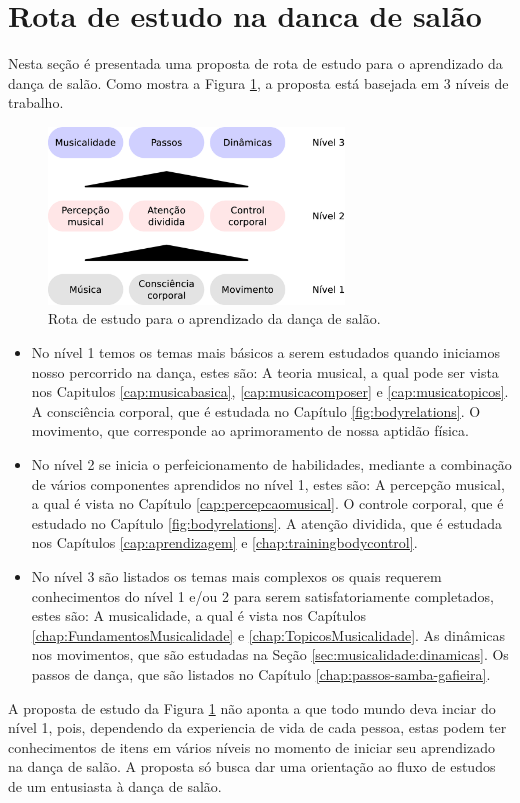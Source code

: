 \section{Rota de estudo na danca de salão}
\label{sec:dance-elements-processo}
Nesta seção é presentada uma proposta de rota de estudo para o aprendizado da
dança de salão. 
Como mostra a Figura \ref{fig:dance-elements-processo},
a proposta está basejada em 3 níveis de trabalho.
\begin{figure}[!h]
\centering
\includegraphics[width=0.7\textwidth]{chapters/cap-dance-elements/Diagrama-danca.eps}
\caption{Rota de estudo para o aprendizado da dança de salão.}
\label{fig:dance-elements-processo}
\end{figure}
\begin{itemize}
\item No nível 1 temos os temas mais básicos a serem estudados quando
iniciamos nosso percorrido na dança, estes são:
A teoria musical, a qual pode ser vista nos 
Capitulos \ref{cap:musicabasica}, \ref{cap:musicacomposer} e \ref{cap:musicatopicos}.
A consciência corporal, que é estudada no Capítulo \ref{fig:bodyrelations}.
O movimento, que corresponde ao aprimoramento de nossa aptidão física.
\item No nível 2 se inicia o perfeicionamento de habilidades,
mediante a combinação de vários componentes aprendidos no nível 1, estes são:
A percepção musical, a qual é vista no Capítulo \ref{cap:percepcaomusical}.
O controle corporal, que é estudado no Capítulo \ref{fig:bodyrelations}.
A atenção dividida, que é estudada nos Capítulos \ref{cap:aprendizagem} e \ref{chap:trainingbodycontrol}.
\item No nível 3 são listados os temas mais complexos os quais
requerem conhecimentos do nível 1 e/ou 2 para serem satisfatoriamente completados,
estes são:
A musicalidade, a qual é vista nos Capítulos \ref{chap:FundamentosMusicalidade} e \ref{chap:TopicosMusicalidade}.
As dinâmicas nos movimentos, que são estudadas na Seção \ref{sec:musicalidade:dinamicas}.
Os passos de dança, que são listados no Capítulo \ref{chap:passos-samba-gafieira}.
\end{itemize}
A proposta de estudo da Figura \ref{fig:dance-elements-processo} não aponta a que 
todo mundo deva inciar do nível 1, 
pois, dependendo da experiencia de vida de cada pessoa, estas podem ter conhecimentos de itens
em vários níveis no momento de iniciar seu aprendizado na dança de salão.
A proposta só busca dar uma orientação ao fluxo de estudos de um entusiasta à dança de salão.
